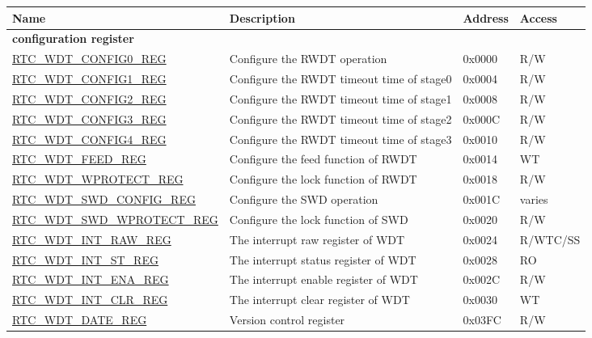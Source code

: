 \begin{longtable}{ | p{6cm} | p{7.2cm} | p{1.3cm} | p{1.5cm} | }
\hline\rowcolor{lightgray}
\textbf{Name} & \textbf{Description} &  \textbf{Address} & \textbf{Access} \\ \hline
\endhead
\multicolumn{4}{|l|}{\textbf{configuration register}} \\ \hline
\hyperref[regdesc:RTCWDTCONFIG0REG]{RTC\_WDT\_CONFIG0\_REG} & Configure the RWDT operation & 0x0000 & R/W \\ \hline
\hyperref[regdesc:RTCWDTCONFIG1REG]{RTC\_WDT\_CONFIG1\_REG} & Configure the RWDT timeout time of stage0 & 0x0004 & R/W \\ \hline
\hyperref[regdesc:RTCWDTCONFIG2REG]{RTC\_WDT\_CONFIG2\_REG} & Configure the RWDT timeout time of stage1 & 0x0008 & R/W \\ \hline
\hyperref[regdesc:RTCWDTCONFIG3REG]{RTC\_WDT\_CONFIG3\_REG} & Configure the RWDT timeout time of stage2 & 0x000C & R/W \\ \hline
\hyperref[regdesc:RTCWDTCONFIG4REG]{RTC\_WDT\_CONFIG4\_REG} & Configure the RWDT timeout time of stage3 & 0x0010 & R/W \\ \hline
\hyperref[regdesc:RTCWDTFEEDREG]{RTC\_WDT\_FEED\_REG} & Configure the feed function of RWDT & 0x0014 & WT \\ \hline
\hyperref[regdesc:RTCWDTWPROTECTREG]{RTC\_WDT\_WPROTECT\_REG} & Configure the lock function of RWDT & 0x0018 & R/W \\ \hline
\hyperref[regdesc:RTCWDTSWDCONFIGREG]{RTC\_WDT\_SWD\_CONFIG\_REG} & Configure the SWD operation & 0x001C & varies \\ \hline
\hyperref[regdesc:RTCWDTSWDWPROTECTREG]{RTC\_WDT\_SWD\_WPROTECT\_REG} & Configure the lock function of SWD & 0x0020 & R/W \\ \hline
\hyperref[regdesc:RTCWDTINTRAWREG]{RTC\_WDT\_INT\_RAW\_REG} & The interrupt raw register of WDT & 0x0024 & R/WTC/SS \\ \hline
\hyperref[regdesc:RTCWDTINTSTREG]{RTC\_WDT\_INT\_ST\_REG} & The interrupt status register of WDT & 0x0028 & RO \\ \hline
\hyperref[regdesc:RTCWDTINTENAREG]{RTC\_WDT\_INT\_ENA\_REG} & The interrupt enable register of WDT & 0x002C & R/W \\ \hline
\hyperref[regdesc:RTCWDTINTCLRREG]{RTC\_WDT\_INT\_CLR\_REG} & The interrupt clear register of WDT & 0x0030 & WT \\ \hline
\hyperref[regdesc:RTCWDTDATEREG]{RTC\_WDT\_DATE\_REG} & Version control register & 0x03FC & R/W \\ \hline
\end{longtable}
